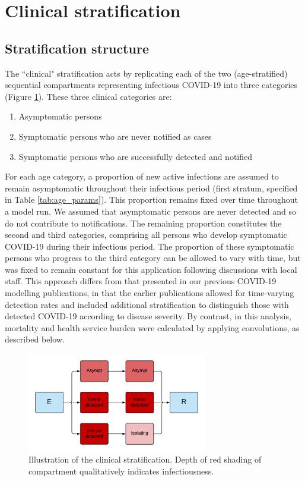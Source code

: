\section{Clinical stratification} \label{clin}
\subsection{Stratification structure}
The ``clinical" stratification acts by replicating 
each of the two (age-stratified) sequential compartments representing infectious COVID-19 
into three categories (Figure \ref{fig:seeiir}).
These three clinical categories are:
\begin{enumerate}
    \item Asymptomatic persons
    \item Symptomatic persons who are never notified as cases
    \item Symptomatic persons who are successfully detected and notified
\end{enumerate}
For each age category, a proportion of new active infections are assumed to remain asymptomatic 
throughout their infectious period (first stratum, specified in Table \ref{tab:age_params}).
This proportion remains fixed over time throughout a model run.
We assumed that asymptomatic persons are never detected 
and so do not contribute to notifications.
The remaining proportion constitutes the second and third categories, 
comprising all persons who develop symptomatic COVID-19 during their infectious period.
The proportion of these symptomatic persons who progress to the third category 
can be allowed to vary with time,
but was fixed to remain constant for this application following discussions with local staff.
This approach differs from that presented in our previous COVID-19 modelling publications,
in that the earlier publications allowed for time-varying detection rates and
included additional stratification 
to distinguish those with detected COVID-19 according to disease severity.
By contrast, in this analysis, mortality and health service burden were calculated
by applying convolutions, as described below.
\begin{figure}[ht]
    \begin{center}
    \includegraphics[width=0.7\textwidth]{../../tex_descriptions/models/sm_sir/stratifications/clinical_strat.pdf}
    \end{center}
    \caption{Illustration of the clinical stratification. \small Depth of red shading of compartment qualitatively indicates infectiousness.}
    \label{fig:seeiir}
\end{figure}
